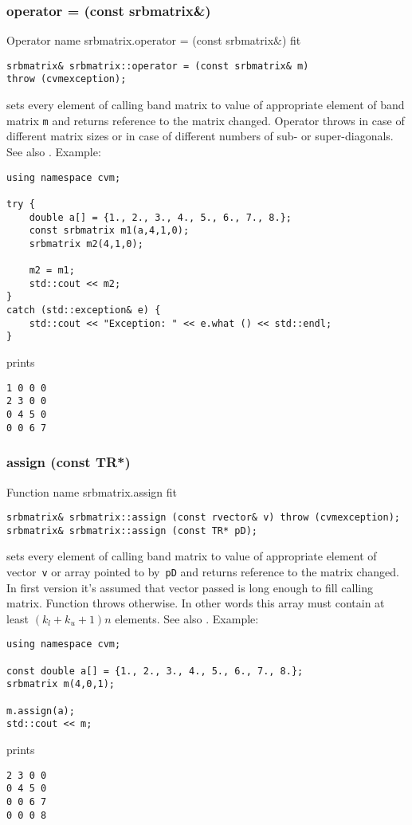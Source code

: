 \subsubsection{operator = (const srbmatrix\&)}
Operator%
\pdfdest name {srbmatrix.operator = (const srbmatrix&)} fit
\begin{verbatim}
srbmatrix& srbmatrix::operator = (const srbmatrix& m)
throw (cvmexception);
\end{verbatim}
sets every element of  calling band matrix to  value of
appropriate element of  band matrix \verb"m"
and returns  reference to
the matrix changed.
Operator throws  
in case of different matrix sizes or in case of different numbers
of sub- or super-diagonals.
See also .
Example:
\begin{Verbatim}
using namespace cvm;

try {
    double a[] = {1., 2., 3., 4., 5., 6., 7., 8.};
    const srbmatrix m1(a,4,1,0);
    srbmatrix m2(4,1,0);

    m2 = m1;
    std::cout << m2;
}
catch (std::exception& e) {
    std::cout << "Exception: " << e.what () << std::endl;
}
\end{Verbatim}
prints
\begin{Verbatim}
1 0 0 0
2 3 0 0
0 4 5 0
0 0 6 7
\end{Verbatim}
\newpage



\subsubsection{assign (const TR*)}
Function%
\pdfdest name {srbmatrix.assign} fit
\begin{verbatim}
srbmatrix& srbmatrix::assign (const rvector& v) throw (cvmexception);
srbmatrix& srbmatrix::assign (const TR* pD);
\end{verbatim}
sets every element of  calling band matrix to  value of
appropriate element of  vector~\verb'v'
or  array pointed to by~\verb"pD"
and returns  reference to
the matrix changed.
In first version it's assumed that vector passed is long
enough to fill calling matrix. Function throws  
otherwise.
In other words this array must contain at least $(k_l + k_u + 1)n$ elements.
See also .
Example:
\begin{Verbatim}
using namespace cvm;

const double a[] = {1., 2., 3., 4., 5., 6., 7., 8.};
srbmatrix m(4,0,1);

m.assign(a);
std::cout << m;
\end{Verbatim}
prints
\begin{Verbatim}
2 3 0 0
0 4 5 0
0 0 6 7
0 0 0 8
\end{Verbatim}
\newpage


